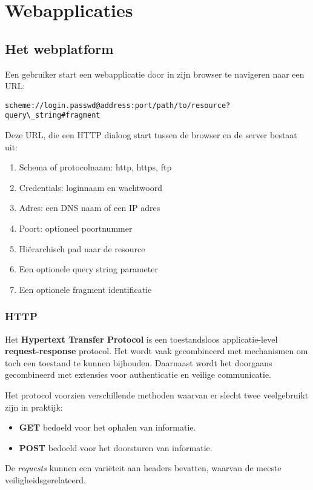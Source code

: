 \documentclass[../main.tex]{subfiles}
\begin{document}
\chapter{Webapplicaties}

\section{Het webplatform}
Een gebruiker start een webapplicatie door in zijn browser te navigeren naar een URL:

\begin{lstlisting}[caption=URL]
scheme://login.passwd@address:port/path/to/resource?query\_string#fragment
\end{lstlisting}
Deze URL, die een HTTP dialoog start tussen de browser en de server bestaat uit:
\begin{multicols}{2}
\begin{enumerate}
	\item Schema of protocolnaam: http, https, ftp
	\item Credentials: loginnaam en wachtwoord
	\item Adres: een DNS naam of een IP adres
	\item Poort: optioneel poortnummer
	\item Hi\"erarchisch pad naar de resource
	\item Een optionele query string parameter
	\item Een optionele fragment identificatie 
\end{enumerate}
\end{multicols}

\subsection{HTTP}
Het \textbf{Hypertext Transfer Protocol} is een toestandsloos applicatie-level \textbf{request-response} protocol. Het wordt vaak gecombineerd met mechanismen om toch een toestand te kunnen bijhouden. Daarnaast wordt het doorgaans gecombineerd met extensies voor authenticatie en veilige communicatie. 

Het protocol voorzien verschillende methoden waarvan er slecht twee veelgebruikt zijn in praktijk:
\begin{itemize}
	\item \textbf{GET} bedoeld voor het ophalen van informatie. 
	\item \textbf{POST} bedoeld voor het doorsturen van informatie.
\end{itemize}
De \textit{requests} kunnen een vari\"eteit aan headers bevatten, waarvan de meeste veiligheidsgerelateerd.
\end{document}

